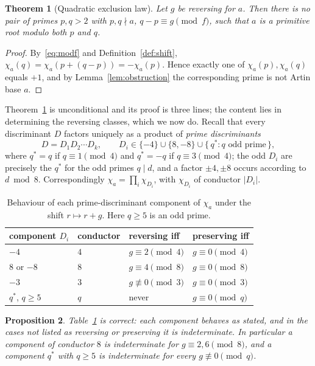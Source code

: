 \documentclass[11pt,reqno]{amsart}
\theoremstyle{plain}
\newtheorem{theorem}{Theorem}
\newtheorem{proposition}[theorem]{Proposition}
\theoremstyle{definition}
\begin{document}
\begin{theorem}[Quadratic exclusion law]
\label{thm:exclusion}
Let $g$ be reversing for $a$. Then there is no pair of primes $p, q > 2$ with
$p, q \nmid a$, $q - p \equiv g \pmod f$, such that $a$ is a primitive root
modulo both $p$ and $q$.
\end{theorem}

\begin{proof}
By~\eqref{eq:modf} and Definition~\ref{def:shift},
$\chi_a(q) = \chi_a(p + (q-p)) = -\chi_a(p)$. Hence exactly one of
$\chi_a(p), \chi_a(q)$ equals $+1$, and by Lemma~\ref{lem:obstruction} the
corresponding prime is not Artin base $a$.
\end{proof}

Theorem~\ref{thm:exclusion} is unconditional and its proof is three lines; the
content lies in determining the reversing classes, which we now do. Recall that
every discriminant $D$ factors uniquely as a product of \emph{prime
discriminants}
\begin{equation}
\label{eq:primedisc}
  D = D_1 D_2 \cdots D_k, \qquad
  D_i \in \{-4\} \cup \{8, -8\} \cup \{\, q^* : q \text{ odd prime} \,\},
\end{equation}
where $q^* = q$ if $q \equiv 1 \pmod 4$ and $q^* = -q$ if $q \equiv 3 \pmod 4$;
the odd $D_i$ are precisely the $q^*$ for the odd primes $q \mid d$, and a
factor $\pm 4, \pm 8$ occurs according to $d \bmod 8$. Correspondingly
$\chi_a = \prod_i \chi_{D_i}$, with $\chi_{D_i}$ of conductor $|D_i|$.

\begin{table}[t]
\centering
\caption{Behaviour of each prime-discriminant component of $\chi_a$ under the
shift $r \mapsto r + g$. Here $q \ge 5$ is an odd prime.}
\label{tab:components}
\begin{tabular}{llll}
\toprule
component $D_i$ & conductor & reversing iff & preserving iff \\
\midrule
$-4$        & $4$ & $g \equiv 2 \pmod 4$   & $g \equiv 0 \pmod 4$ \\
$8$ or $-8$ & $8$ & $g \equiv 4 \pmod 8$   & $g \equiv 0 \pmod 8$ \\
$-3$        & $3$ & $g \not\equiv 0 \pmod 3$ & $g \equiv 0 \pmod 3$ \\
$q^*$, $q \ge 5$ & $q$ & never             & $g \equiv 0 \pmod q$ \\
\bottomrule
\end{tabular}
\end{table}

\begin{proposition}
\label{prop:components}
Table~\ref{tab:components} is correct: each component behaves as stated, and in
the cases not listed as reversing or preserving it is indeterminate. In
particular a component of conductor $8$ is indeterminate for
$g \equiv 2, 6 \pmod 8$, and a component $q^*$ with $q \ge 5$ is indeterminate
for every $g \not\equiv 0 \pmod q$.
\end{proposition}
\end{document}
